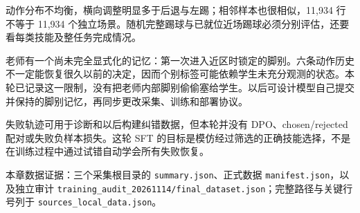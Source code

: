 动作分布不均衡，横向调整明显多于后退与左踢；相邻样本也很相似，11,934 行不等于 11,934 个独立场景。随机完整踢球与已就位近场踢球必须分别评估，还要看每类技能及整任务完成情况。

老师有一个尚未完全显式化的记忆：第一次进入近区时锁定的脚别。六条动作历史不一定能恢复很久以前的决定，因而个别标签可能依赖学生未充分观测的状态。本轮已记录这一限制，没有把老师内部脚别偷偷塞给学生。以后可设计模型自己提交并保持的脚别记忆，再同步更改采集、训练和部署协议。

失败轨迹可用于诊断和以后构建纠错数据，但本轮并没有 DPO、chosen/rejected 配对或失败负样本损失。这轮 SFT 的目标是模仿经过筛选的正确技能选择，不是在训练过程中通过试错自动学会所有失败恢复。

本章数据证据：三个采集根目录的 \texttt{summary.json}、正式数据 \texttt{manifest.json}，以及独立审计 \texttt{training\_audit\_20261114/final\_dataset.json}；完整路径与关键行号列于 \texttt{sources\_local\_data.json}。
